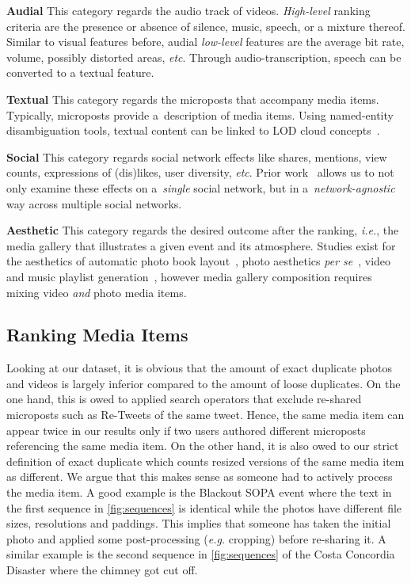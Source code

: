 \noindent \textbf{Audial}
This category regards the audio track of videos.
\emph{High-level} ranking criteria are the presence or absence
of silence, music, speech, or a mixture thereof.
Similar to visual features before,
audial \emph{low-level} features are the average bit rate,
volume, possibly distorted areas, \emph{etc}.
Through audio-transcription, speech can be converted to a textual feature.

\noindent \textbf{Textual}
This category regards the microposts that accompany media items.
Typically, microposts provide a~description of media items.
Using named-entity disambiguation tools,
textual content can be linked to LOD cloud concepts~\cite{Facebook2011}.

\noindent \textbf{Social}
This category regards social network effects like shares, mentions,
view counts, expressions of (dis)likes, user diversity, \emph{etc}.
Prior work~\cite{Khrouf2012} allows us to not only examine these effects
on a~\emph{single} social network,
but in a~\emph{network-agnostic} way across multiple social networks.

\noindent \textbf{Aesthetic}
This category regards the desired outcome after the ranking, \emph{i.e.},
the media gallery that illustrates a given event and its atmosphere.
Studies exist for the aesthetics of
automatic photo book layout~\cite{Photo2011},
photo aesthetics \emph{per se}~\cite{Photo2012},
video and music playlist generation~\cite{YouTube2010,Playlist2006},
however media gallery composition requires mixing video
\emph{and} photo media items.

\subsection{Ranking Media Items}
Looking at our dataset, it is obvious that the amount of exact duplicate photos and videos is largely inferior compared to the amount of loose duplicates. On the one hand, this is owed to applied search operators that exclude re-shared microposts such as Re-Tweets of the same tweet. Hence, the same media item can appear twice in our results only if two users authored different microposts referencing the same media item. On the other hand, it is also owed to our strict definition of exact duplicate which counts resized versions of the same media item as different. We argue that this makes sense as someone had to actively process the media item. A good example is the Blackout SOPA event where the text in the first sequence in \autoref{fig:sequences} is identical while the photos have different file sizes, resolutions and paddings. This implies that someone has taken the initial photo and applied some post-processing (\emph{e.g.} cropping) before re-sharing it. A similar example is the second sequence in \autoref{fig:sequences} of the Costa Concordia Disaster where the chimney got cut off.

